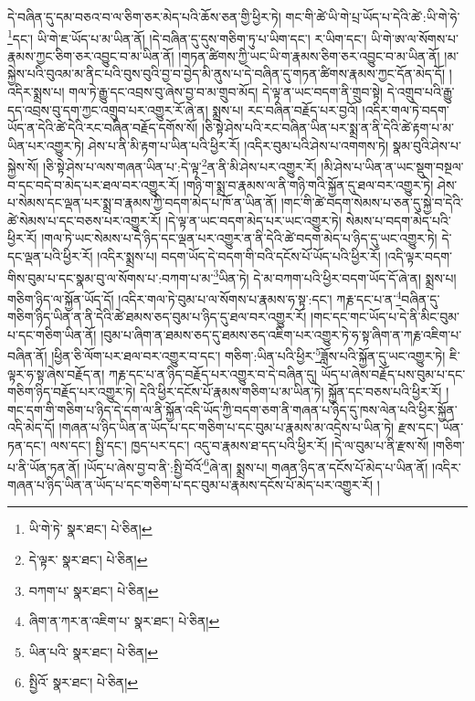 དེ་བཞིན་དུ་དམ་བཅའ་བ་ལ་ཅིག་ཅར་མེད་པའི་ཆོས་ཅན་གྱི་ཕྱིར་ཏེ། གང་གི་ཚེ་ཡི་གེ་པྲ་ཡོད་པ་དེའི་ཚེ་:ཡི་གེ་ཧེ་\footnote{ཡི་གེ་ཏེ་  སྣར་ཐང་།  པེ་ཅིན། }དང་། ཡི་གེ་ཇ་ཡོད་པ་མ་ཡིན་ནོ། །དེ་བཞིན་དུ་དུས་གཅིག་ཏུ་པ་ཡིག་དང་། ར་ཡིག་དང་། ཡི་གེ་ཨ་ལ་སོགས་པ་རྣམས་ཀྱང་ཅིག་ཅར་འབྱུང་བ་མ་ཡིན་ནོ། །གཏན་ཚིགས་ཀྱི་ཡང་ཡི་ག་རྣམས་ཅིག་ཅར་འབྱུང་བ་མ་ཡིན་ནོ། །མ་སྐྱེས་པའི་བུའམ་མ་ནིང་པའི་བུས་བུའི་བྱ་བ་བྱེད་མི་ནུས་པ་དེ་བཞིན་དུ་གཏན་ཚིགས་རྣམས་ཀྱང་དོན་མེད་དོ། །འདིར་སྨྲས་པ། གལ་ཏེ་རྒྱུ་དང་འབྲས་བུ་ཞེས་བྱ་བ་མ་གྲུབ་མོད། དེ་ལྟ་ན་ཡང་བདག་ནི་གྲུབ་སྟེ། དེ་འགྲུབ་པའི་རྒྱུ་དད་འབྲས་བུ་དག་ཀྱང་འགྲུབ་པར་འགྱུར་རོ་ཞེ་ན། སྨྲས་པ། རང་བཞིན་བརྗོད་པར་བྱའོ། །འདིར་གལ་ཏེ་བདག་ཡོད་ན་དེའི་ཚེ་དེའི་རང་བཞིན་བརྗོད་དགོས་སོ། །ཅི་སྟེ་ཤེས་པའི་རང་བཞིན་ཡིན་པར་སྨྲ་ན་ནི་དེའི་ཚེ་རྟག་པ་མ་ཡིན་པར་འགྱུར་ཏེ། ཤེས་པ་ནི་མི་རྟག་པ་ཡིན་པའི་ཕྱིར་རོ། །འདིར་བུམ་པའི་ཤེས་པ་འགགས་ཏེ། སྣམ་བུའི་ཤེས་པ་སྐྱེས་སོ། །ཅི་སྟེ་ཤེས་པ་ལས་གཞན་ཡིན་པ་:དེ་ལྟ་\footnote{དེ་ལྟར་  སྣར་ཐང་།  པེ་ཅིན། }ན་ནི་མི་ཤེས་པར་འགྱུར་རོ། །མི་ཤེས་པ་ཡིན་ན་ཡང་སྡུག་བསྔལ་བ་དང་བདེ་བ་མེད་པར་ཐལ་བར་འགྱུར་རོ། །གཉི་ག་སྨྲ་བ་རྣམས་ལ་ནི་གཉི་གའི་སྐྱོན་དུ་ཐལ་བར་འགྱུར་ཏེ། ཤེས་པ་སེམས་དང་ལྡན་པར་སྨྲ་བ་རྣམས་ཀྱི་བདག་མེད་པ་ཁོ་ན་ཡིན་ནོ། །གང་གི་ཚེ་བདག་སེམས་པ་ཅན་དུ་སྐྱེ་བ་དེའི་ཚེ་སེམས་པ་དང་བཅས་པར་འགྱུར་རོ། །དེ་ལྟ་ན་ཡང་བདག་མེད་པར་ཡང་འགྱུར་ཏེ། སེམས་པ་བདག་མེད་པའི་ཕྱིར་རོ། །གལ་ཏེ་ཡང་སེམས་པ་དེ་ཉིད་དང་ལྡན་པར་འགྱུར་ན་ནི་དེའི་ཚེ་བདག་མེད་པ་ཉིད་དུ་ཡང་འགྱུར་ཏེ། དེ་དང་ལྡན་པའི་ཕྱིར་རོ། །འདིར་སྨྲས་པ། བདག་ཡོད་དེ་བདག་གི་བའི་དངོས་པོ་ཡོད་པའི་ཕྱིར་རོ། །འདི་ལྟར་བདག་གིས་བུམ་པ་དང་སྣམ་བུ་ལ་སོགས་པ་:བཀག་པ་མ་\footnote{བཀག་པ་  སྣར་ཐང་།  པེ་ཅིན། }ཡིན་ཏེ། དེ་མ་བཀག་པའི་ཕྱིར་བདག་ཡོད་དོ་ཞེ་ན། སྨྲས་པ། གཅིག་ཉིད་ལ་སྐྱོན་ཡོད་དོ། །འདིར་གལ་ཏེ་བུམ་པ་ལ་སོགས་པ་རྣམས་ཧ་སྟ་:དང་། ཀརྞ་དང་པ་ན་\footnote{ཞིག་ན་ཀར་ན་འཇིག་པ་  སྣར་ཐང་།  པེ་ཅིན། }བཞིན་དུ་གཅིག་ཉིད་ཡིན་ན་ནི་དེའི་ཚེ་ཐམས་ཅད་བུམ་པ་ཉིད་དུ་ཐལ་བར་འགྱུར་རོ། །གང་དང་གང་ཡོད་པ་དེ་ནི་མིང་བུམ་པ་དང་གཅིག་ཡིན་ནོ། །བུམ་པ་ཞིག་ན་ཐམས་ཅད་དུ་ཐམས་ཅད་འཇིག་པར་འགྱུར་ཏེ་ཧ་སྟ་ཞིག་ན་ཀརྞ་འཇིག་པ་བཞིན་ནོ། །ཕྱིན་ཅི་ལོག་པར་ཐལ་བར་འགྱུར་བ་དང་། གཅིག་:ཡིན་པའི་ཕྱིར་\footnote{ཡིན་པའི་  སྣར་ཐང་།  པེ་ཅིན། }ཟློས་པའི་སྐྱོན་དུ་ཡང་འགྱུར་ཏེ། ཇི་ལྟར་ཧ་སྟ་ཞེས་བརྗོད་ན། ཀརྞ་དང་པ་ན་ཉིད་བརྗོད་པར་འགྱུར་བ་དེ་བཞིན་དུ། ཡོད་པ་ཞེས་བརྗོད་པས་བུམ་པ་དང་གཅིག་ཉིད་བརྗོད་པར་འགྱུར་ཏེ། དེའི་ཕྱིར་དངོས་པོ་རྣམས་གཅིག་པ་མ་ཡིན་ཏེ། སྐྱོན་དང་བཅས་པའི་ཕྱིར་རོ། །གང་དག་གི་གཅིག་པ་ཉིད་དེ་དག་ལ་ནི་སྐྱོན་འདི་ཡོད་ཀྱི་བདག་ཅག་ནི་གཞན་པ་ཉིད་དུ་ཁས་ལེན་པའི་ཕྱིར་སྐྱོན་འདི་མེད་དོ། །གཞན་པ་ཉིད་ཡིན་ན་ཡོད་པ་དང་གཅིག་པ་དང་བུམ་པ་རྣམས་མ་འདྲེས་པ་ཡིན་ཏེ། རྫས་དང་། ཡོན་ཏན་དང་། ལས་དང་། སྤྱི་དང་། ཁྱད་པར་དང་། འདུ་བ་རྣམས་ཐ་དད་པའི་ཕྱིར་རོ། །དེ་ལ་བུམ་པ་ནི་རྫས་སོ། །གཅིག་པ་ནི་ཡོན་ཏན་ནོ། །ཡོད་པ་ཞེས་བྱ་བ་ནི་:སྤྱི་བོའོ་\footnote{སྤྱིའོ་  སྣར་ཐང་།  པེ་ཅིན། }ཞེ་ན། སྨྲས་པ། གཞན་ཉིད་ན་དངོས་པོ་མེད་པ་ཡིན་ནོ། །འདིར་གཞན་པ་ཉིད་ཡིན་ན་ཡོད་པ་དང་གཅིག་པ་དང་བུམ་པ་རྣམས་དངོས་པོ་མེད་པར་འགྱུར་རོ། །
